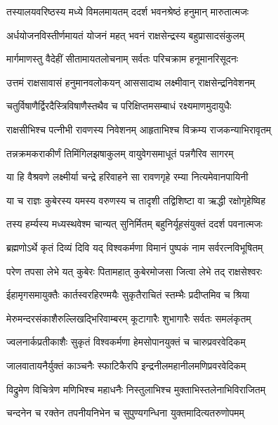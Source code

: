 
\twolineshloka
{तस्यालयवरिष्ठस्य मध्ये विमलमायतम्}
{ददर्श भवनश्रेष्ठं हनुमान् मारुतात्मजः} %

\twolineshloka
{अर्धयोजनविस्तीर्णमायतं योजनं महत्}
{भवनं राक्षसेन्द्रस्य बहुप्रासादसंकुलम्} %

\twolineshloka
{मार्गमाणस्तु वैदेहीं सीतामायतलोचनाम्}
{सर्वतः परिचक्राम हनूमानरिसूदनः} %

\twolineshloka
{उत्तमं राक्षसावासं हनुमानवलोकयन्}
{आससादाथ लक्ष्मीवान् राक्षसेन्द्रनिवेशनम्} %

\twolineshloka
{चतुर्विषाणैर्द्विरदैस्त्रिविषाणैस्तथैव च}
{परिक्षिप्तमसम्बाधं रक्ष्यमाणमुदायुधैः} %

\twolineshloka
{राक्षसीभिश्च पत्नीभी रावणस्य निवेशनम्}
{आहृताभिश्च विक्रम्य राजकन्याभिरावृतम्} %

\twolineshloka
{तन्नक्रमकराकीर्णं तिमिंगिलझषाकुलम्}
{वायुवेगसमाधूतं पन्नगैरिव सागरम्} %

\twolineshloka
{या हि वैश्रवणे लक्ष्मीर्या चन्द्रे हरिवाहने}
{सा रावणगृहे रम्या नित्यमेवानपायिनी} %

\twolineshloka
{या च राज्ञः कुबेरस्य यमस्य वरुणस्य च}
{तादृशी तद्विशिष्टा वा ऋद्धी रक्षोगृहेष्विह} %

\twolineshloka
{तस्य हर्म्यस्य मध्यस्थवेश्म चान्यत् सुनिर्मितम्}
{बहुनिर्यूहसंयुक्तं ददर्श पवनात्मजः} %

\twolineshloka
{ब्रह्मणोऽर्थे कृतं दिव्यं दिवि यद् विश्वकर्मणा}
{विमानं पुष्पकं नाम सर्वरत्नविभूषितम्} %

\twolineshloka
{परेण तपसा लेभे यत् कुबेरः पितामहात्}
{कुबेरमोजसा जित्वा लेभे तद् राक्षसेश्वरः} %

\twolineshloka
{ईहामृगसमायुक्तैः कार्तस्वरहिरण्मयैः}
{सुकृतैराचितं स्तम्भैः प्रदीप्तमिव च श्रिया} %

\twolineshloka
{मेरुमन्दरसंकाशैरुल्लिखद्भिरिवाम्बरम्}
{कूटागारैः शुभागारैः सर्वतः समलंकृतम्} %

\twolineshloka
{ज्वलनार्कप्रतीकाशैः सुकृतं विश्वकर्मणा}
{हेमसोपानयुक्तं च चारुप्रवरवेदिकम्} %

\twolineshloka
{जालवातायनैर्युक्तं काञ्चनैः स्फाटिकैरपि}
{इन्द्रनीलमहानीलमणिप्रवरवेदिकम्} %

\twolineshloka
{विद्रुमेण विचित्रेण मणिभिश्च महाधनैः}
{निस्तुलाभिश्च मुक्ताभिस्तलेनाभिविराजितम्} %

\twolineshloka
{चन्दनेन च रक्तेन तपनीयनिभेन च}
{सुपुण्यगन्धिना युक्तमादित्यतरुणोपमम्} %

